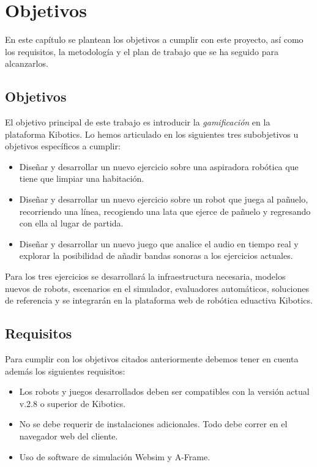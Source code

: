 \chapter{Objetivos }\label{objetivos}

En este capítulo se plantean los objetivos a cumplir con este proyecto, así como los requisitos, la metodología y el plan de trabajo que se ha seguido para alcanzarlos.

\section{Objetivos}

El objetivo principal de este trabajo es introducir la \textit{gamificación} en la plataforma Kibotics. Lo hemos articulado en los siguientes tres subobjetivos u objetivos específicos a cumplir:

\begin{itemize}
    \item Diseñar y desarrollar un nuevo ejercicio sobre una aspiradora robótica que tiene que limpiar una habitación.

    \item Diseñar y desarrollar un nuevo ejercicio sobre un robot que juega al pañuelo, recorriendo una línea, recogiendo una lata que ejerce de pañuelo y regresando con ella al lugar de partida.
    
      \item Diseñar y desarrollar un nuevo juego que analice el audio en tiempo real y explorar la posibilidad de añadir bandas sonoras a los ejercicios actuales. 

\end{itemize}

Para los tres ejercicios se desarrollará la infraestructura necesaria, modelos nuevos de robots, escenarios en el simulador, evaluadores automáticos, soluciones de referencia y se integrarán en la plataforma web de robótica eduactiva Kibotics.
    
\newpage

\section{Requisitos}
Para cumplir con los objetivos citados anteriormente debemos tener en cuenta además los siguientes  requisitos: 
\begin{itemize}
    \item Los robots y juegos desarrollados deben ser compatibles con la versión actual v.2.8 o superior de Kibotics.
    \item No se debe requerir de instalaciones adicionales. Todo debe correr en el navegador web del cliente. 
    \item Uso de software de simulación Websim y A-Frame.
\end{itemize}


